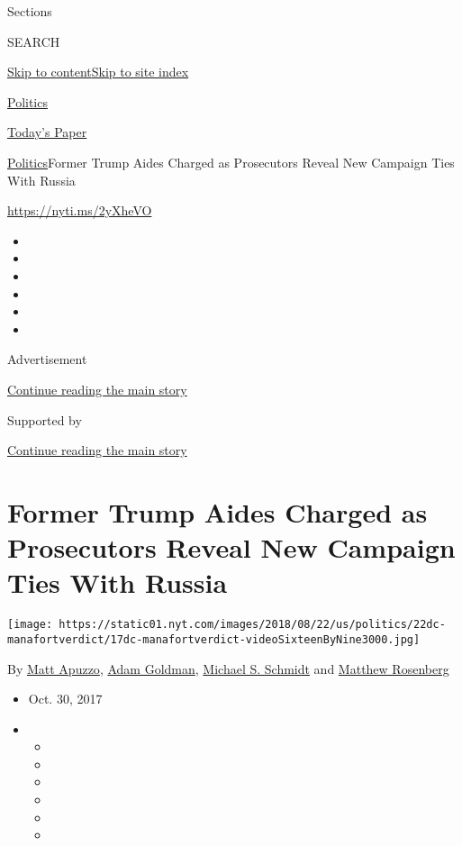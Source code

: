 Sections

SEARCH

\protect\hyperlink{site-content}{Skip to
content}\protect\hyperlink{site-index}{Skip to site index}

\href{https://www.nytimes.com/section/politics}{Politics}

\href{https://myaccount.nytimes.com/auth/login?response_type=cookie\&client_id=vi}{}

\href{https://www.nytimes.com/section/todayspaper}{Today's Paper}

\href{/section/politics}{Politics}\textbar{}Former Trump Aides Charged
as Prosecutors Reveal New Campaign Ties With Russia

\url{https://nyti.ms/2yXheVO}

\begin{itemize}
\item
\item
\item
\item
\item
\item
\end{itemize}

Advertisement

\protect\hyperlink{after-top}{Continue reading the main story}

Supported by

\protect\hyperlink{after-sponsor}{Continue reading the main story}

\hypertarget{former-trump-aides-charged-as-prosecutors-reveal-new-campaign-ties-with-russia}{%
\section{Former Trump Aides Charged as Prosecutors Reveal New Campaign
Ties With
Russia}\label{former-trump-aides-charged-as-prosecutors-reveal-new-campaign-ties-with-russia}}

\texttt{[image: https://static01.nyt.com/images/2018/08/22/us/politics/22dc-manafortverdict/17dc-manafortverdict-videoSixteenByNine3000.jpg]}

By \href{http://www.nytimes.com/by/matt-apuzzo}{Matt Apuzzo},
\href{https://www.nytimes.com/by/adam-goldman}{Adam Goldman},
\href{http://www.nytimes.com/by/michael-s-schmidt}{Michael S. Schmidt}
and \href{http://www.nytimes.com/by/matthew-rosenberg}{Matthew
Rosenberg}

\begin{itemize}
\item
  Oct. 30, 2017
\item
  \begin{itemize}
  \item
  \item
  \item
  \item
  \item
  \item
  \end{itemize}
\end{itemize}

